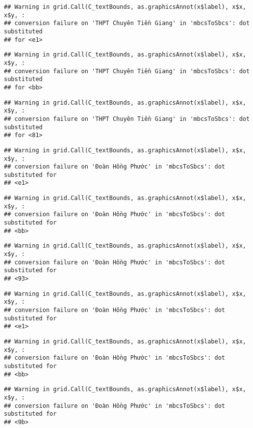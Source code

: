 \documentclass[
]{article}
\begin{document}
\begin{verbatim}
## Warning in grid.Call(C_textBounds, as.graphicsAnnot(x$label), x$x, x$y, :
## conversion failure on 'THPT Chuyên Tiền Giang' in 'mbcsToSbcs': dot substituted
## for <e1>
\end{verbatim}

\begin{verbatim}
## Warning in grid.Call(C_textBounds, as.graphicsAnnot(x$label), x$x, x$y, :
## conversion failure on 'THPT Chuyên Tiền Giang' in 'mbcsToSbcs': dot substituted
## for <bb>
\end{verbatim}

\begin{verbatim}
## Warning in grid.Call(C_textBounds, as.graphicsAnnot(x$label), x$x, x$y, :
## conversion failure on 'THPT Chuyên Tiền Giang' in 'mbcsToSbcs': dot substituted
## for <81>
\end{verbatim}

\begin{verbatim}
## Warning in grid.Call(C_textBounds, as.graphicsAnnot(x$label), x$x, x$y, :
## conversion failure on 'Đoàn Hồng Phước' in 'mbcsToSbcs': dot substituted for
## <e1>
\end{verbatim}

\begin{verbatim}
## Warning in grid.Call(C_textBounds, as.graphicsAnnot(x$label), x$x, x$y, :
## conversion failure on 'Đoàn Hồng Phước' in 'mbcsToSbcs': dot substituted for
## <bb>
\end{verbatim}

\begin{verbatim}
## Warning in grid.Call(C_textBounds, as.graphicsAnnot(x$label), x$x, x$y, :
## conversion failure on 'Đoàn Hồng Phước' in 'mbcsToSbcs': dot substituted for
## <93>
\end{verbatim}

\begin{verbatim}
## Warning in grid.Call(C_textBounds, as.graphicsAnnot(x$label), x$x, x$y, :
## conversion failure on 'Đoàn Hồng Phước' in 'mbcsToSbcs': dot substituted for
## <e1>
\end{verbatim}

\begin{verbatim}
## Warning in grid.Call(C_textBounds, as.graphicsAnnot(x$label), x$x, x$y, :
## conversion failure on 'Đoàn Hồng Phước' in 'mbcsToSbcs': dot substituted for
## <bb>
\end{verbatim}

\begin{verbatim}
## Warning in grid.Call(C_textBounds, as.graphicsAnnot(x$label), x$x, x$y, :
## conversion failure on 'Đoàn Hồng Phước' in 'mbcsToSbcs': dot substituted for
## <9b>
\end{verbatim}
\end{document}
